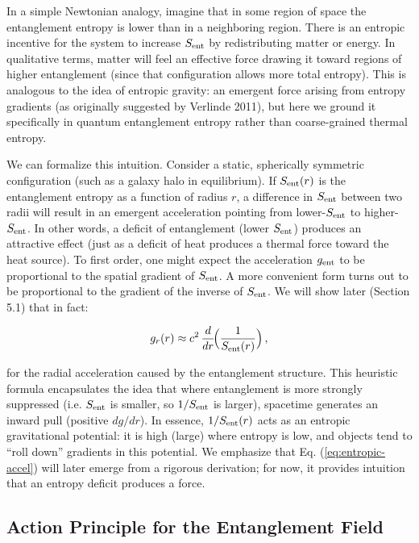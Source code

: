 \documentclass[11pt]{article}
\begin{document}
In a simple Newtonian analogy, imagine that in some region of space the entanglement entropy is lower than in a neighboring region. There is an entropic incentive for the system to increase $S_{\rm ent}$ by redistributing matter or energy. In qualitative terms, matter will feel an effective force drawing it toward regions of higher entanglement (since that configuration allows more total entropy). This is analogous to the idea of entropic gravity: an emergent force arising from entropy gradients (as originally suggested by Verlinde 2011), but here we ground it specifically in quantum entanglement entropy rather than coarse-grained thermal entropy.

We can formalize this intuition. Consider a static, spherically symmetric configuration (such as a galaxy halo in equilibrium). If $S_{\rm ent}(r)$ is the entanglement entropy as a function of radius $r$, a difference in $S_{\rm ent}$ between two radii will result in an emergent acceleration pointing from lower-$S_{\rm ent}$ to higher-$S_{\rm ent}$. In other words, a deficit of entanglement (lower $S_{\rm ent}$) produces an attractive effect (just as a deficit of heat produces a thermal force toward the heat source). To first order, one might expect the acceleration $g_{\rm ent}$ to be proportional to the spatial gradient of $S_{\rm ent}$. A more convenient form turns out to be proportional to the gradient of the inverse of $S_{\rm ent}$. We will show later (Section 5.1) that in fact: 

\begin{equation} 
g_{r}(r) \approx c^2 \,\frac{d}{dr}\!\Big(\frac{1}{S_{\rm ent}(r)}\Big) \,, \label{eq:entropic-accel} 
\end{equation}

for the radial acceleration caused by the entanglement structure. This heuristic formula encapsulates the idea that where entanglement is more strongly suppressed (i.e. $S_{\rm ent}$ is smaller, so $1/S_{\rm ent}$ is larger), spacetime generates an inward pull (positive $dg/dr$). In essence, $1/S_{\rm ent}(r)$ acts as an entropic gravitational potential: it is high (large) where entropy is low, and objects tend to “roll down” gradients in this potential. We emphasize that Eq. (\ref{eq:entropic-accel}) will later emerge from a rigorous derivation; for now, it provides intuition that an entropy deficit produces a force.

\subsection{Action Principle for the Entanglement Field}
\end{document}
